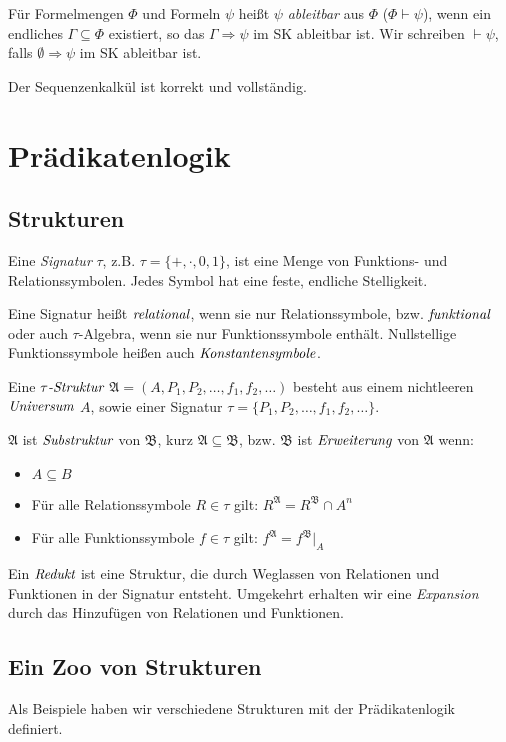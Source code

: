 \documentclass{panikzettel}
\newcommand{\A}{\mathfrak{A}}
\newcommand{\B}{\mathfrak{B}}
\begin{document}
Für Formelmengen $\Phi$ und Formeln $\psi$ heißt $\psi$ \emph{ableitbar} aus $\Phi$ ($\Phi \vdash \psi$), wenn ein endliches $\Gamma \subseteq \Phi$ existiert, so das $\Gamma \Rightarrow \psi$ im SK ableitbar ist. Wir schreiben $\vdash \psi$, falls $\emptyset \Rightarrow \psi$ im SK ableitbar ist.

Der Sequenzenkalkül ist korrekt und vollständig.

\section{Prädikatenlogik}
\subsection{Strukturen}
Eine \emph{Signatur} $\tau$, z.B. $\tau=\{+,\cdot,0,1\}$, ist eine Menge von Funktions- und Relationssymbolen. Jedes Symbol hat eine feste, endliche Stelligkeit.

Eine Signatur heißt $\emph{relational}$, wenn sie nur Relationssymbole, bzw. $\emph{funktional}$ oder auch $\tau$-Algebra, wenn sie nur Funktionssymbole enthält. Nullstellige Funktionssymbole heißen auch $\emph{Konstantensymbole}$.

Eine $\tau\emph{-Struktur}$ $\A=(A,P_1,P_2,\ldots,f_1,f_2,\ldots)$ besteht aus einem nichtleeren $\emph{Universum}$ $A$, sowie einer Signatur $\tau=\{P_1,P_2,\ldots,f_1,f_2,\ldots\}$.

$\A$ ist $\emph{Substruktur}$ von $\B$, kurz $\A \subseteq \B$, bzw. $\B$ ist $\emph{Erweiterung}$ von $\A$ wenn:
\begin{itemize}
    \item $A \subseteq B$
    \item Für alle Relationssymbole $R \in \tau$ gilt: $R^{\A}=R^{\B} \cap A^n$
    \item Für alle Funktionssymbole $f \in \tau$ gilt: $f^{\A}=f^{\B}|_A$
\end{itemize}

Ein $\emph{Redukt}$ ist eine Struktur, die durch Weglassen von Relationen und Funktionen in der Signatur entsteht. Umgekehrt erhalten wir eine \emph{Expansion} durch das Hinzufügen von Relationen und Funktionen.

\subsection{Ein Zoo von Strukturen}

Als Beispiele haben wir verschiedene Strukturen mit der Prädikatenlogik definiert.
\end{document}
